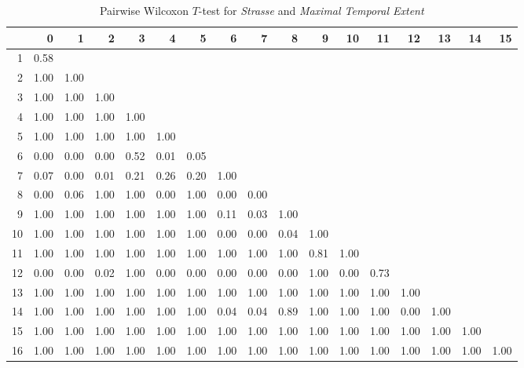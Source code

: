 \begin{table}[ht!]
	\tiny
	\setlength{\tabcolsep}{4pt}
	\centering
  \begin{tabular}{rrrrrrrrrrrrrrrrr}
    \hline
   & 0 & 1 & 2 & 3 & 4 & 5 & 6 & 7 & 8 & 9 & 10 & 11 & 12 & 13 & 14 & 15 \\ 
    \hline
  1 & 0.58 &  &  &  &  &  &  &  &  &  &  &  &  &  &  &  \\ 
    2 & 1.00 & 1.00 &  &  &  &  &  &  &  &  &  &  &  &  &  &  \\ 
    3 & 1.00 & 1.00 & 1.00 &  &  &  &  &  &  &  &  &  &  &  &  &  \\ 
    4 & 1.00 & 1.00 & 1.00 & 1.00 &  &  &  &  &  &  &  &  &  &  &  &  \\ 
    5 & 1.00 & 1.00 & 1.00 & 1.00 & 1.00 &  &  &  &  &  &  &  &  &  &  &  \\ 
    6 & 0.00 & 0.00 & 0.00 & 0.52 & 0.01 & 0.05 &  &  &  &  &  &  &  &  &  &  \\ 
    7 & 0.07 & 0.00 & 0.01 & 0.21 & 0.26 & 0.20 & 1.00 &  &  &  &  &  &  &  &  &  \\ 
    8 & 0.00 & 0.06 & 1.00 & 1.00 & 0.00 & 1.00 & 0.00 & 0.00 &  &  &  &  &  &  &  &  \\ 
    9 & 1.00 & 1.00 & 1.00 & 1.00 & 1.00 & 1.00 & 0.11 & 0.03 & 1.00 &  &  &  &  &  &  &  \\ 
    10 & 1.00 & 1.00 & 1.00 & 1.00 & 1.00 & 1.00 & 0.00 & 0.00 & 0.04 & 1.00 &  &  &  &  &  &  \\ 
    11 & 1.00 & 1.00 & 1.00 & 1.00 & 1.00 & 1.00 & 1.00 & 1.00 & 1.00 & 0.81 & 1.00 &  &  &  &  &  \\ 
    12 & 0.00 & 0.00 & 0.02 & 1.00 & 0.00 & 0.00 & 0.00 & 0.00 & 0.00 & 1.00 & 0.00 & 0.73 &  &  &  &  \\ 
    13 & 1.00 & 1.00 & 1.00 & 1.00 & 1.00 & 1.00 & 1.00 & 1.00 & 1.00 & 1.00 & 1.00 & 1.00 & 1.00 &  &  &  \\ 
    14 & 1.00 & 1.00 & 1.00 & 1.00 & 1.00 & 1.00 & 0.04 & 0.04 & 0.89 & 1.00 & 1.00 & 1.00 & 0.00 & 1.00 &  &  \\ 
    15 & 1.00 & 1.00 & 1.00 & 1.00 & 1.00 & 1.00 & 1.00 & 1.00 & 1.00 & 1.00 & 1.00 & 1.00 & 1.00 & 1.00 & 1.00 &  \\ 
    16 & 1.00 & 1.00 & 1.00 & 1.00 & 1.00 & 1.00 & 1.00 & 1.00 & 1.00 & 1.00 & 1.00 & 1.00 & 1.00 & 1.00 & 1.00 & 1.00 \\ 
     \hline
  \end{tabular}
	\caption{Pairwise Wilcoxon $T$-test for \textit{Strasse} and \textit{Maximal Temporal Extent}}
	\label{tbl:wilcoxon_baysis_matched_Strasse_TMax}
\end{table}
